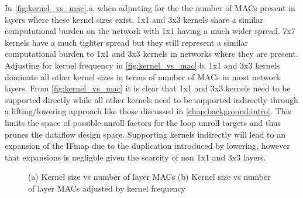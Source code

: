 In \autoref{fig:kernel_vs_mac}.a, when adjusting for the the number of MACs
present in layers where these kernel sizes exist, 1x1 and 3x3 kernels share a
similar computational burden on the network with 1x1 having a much wider spread.
7x7 kernels have a much tighter spread but they still represent a similar
computational burden to 1x1 and 3x3 kernels in networks where they are present.
Adjusting for kernel frequency in \autoref{fig:kernel_vs_mac}.b, 1x1 and 3x3
kernels dominate all other kernel sizes in terms of number of MACs in most
network layers. From \autoref{fig:kernel_vs_mac} it is clear that 1x1 and 3x3
kernels need to be supported directly while all other kernels need to be
supported indirectly through a lifting/lowering approach like those discussed in
\autoref{chap:background:intro}. This limits the space of possible unroll
factors for the loop unroll targets and thus prunes the dataflow design space.
Supporting kernels indirectly will lead to an expansion of the IFmap due to the
duplication introduced by lowering, however that expansions is negligble given
the scarcity of non 1x1 and 3x3 layers. 

\clearpage
\begin{figure}
    \centering
    \caption{(a) Kernel size vs number of layer MACs  (b) Kernel size vs number of layer MACs adjusted by kernel frequency}
    \label{fig:kernel_vs_mac}
\end{figure}

